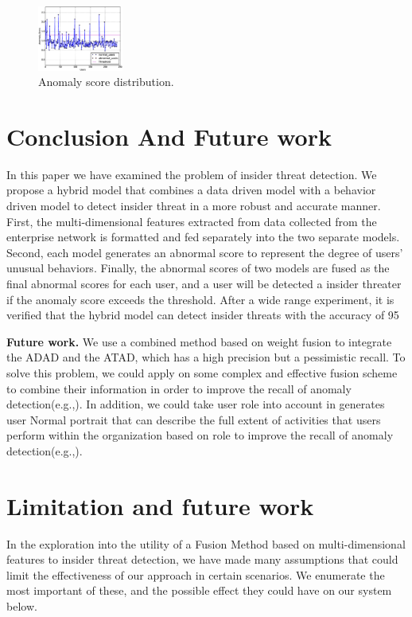 \documentclass[conference]{IEEEtran}
\begin{document}
\begin{figure}[htb]
\centerline{\includegraphics[width = 0.25\textwidth]{figure/figure8.eps}}
\caption{Anomaly score distribution.}
\label{fig}
\end{figure}

\section{Conclusion And Future work}

In this paper we have examined the problem of insider threat detection. We propose a hybrid model that combines a data driven model with a behavior driven model to detect insider threat in a more robust and accurate manner. 
First, the multi-dimensional features extracted from data collected  from the enterprise network is formatted and fed separately into the two separate models. Second, each model generates an abnormal score to represent the degree of users' unusual behaviors. Finally, the abnormal scores of two models are fused as the final abnormal scores for each user, and a user will be detected a insider threater if the anomaly score exceeds the threshold. After a wide range experiment, it is 
verified that the hybrid model can detect insider threats with the accuracy of 95%



\textbf{Future work.}
We use a combined method based on weight fusion to integrate the ADAD and the ATAD, which has a high precision but a pessimistic recall. To solve this problem, we could apply on some complex and effective fusion scheme to combine their information in order to improve the recall of anomaly detection(e.g.,\cite{b49}).  In addition, we could take user role into account in generates user Normal portrait that can describe the full extent of activities that users perform within the organization based on role to improve the recall of anomaly detection(e.g.,\cite{b50}).   	

\iffalse
\section{Limitation and future work}

In the exploration into the utility of a Fusion Method based on multi-dimensional features to insider threat detection, we have made many assumptions that could limit the effectiveness of our approach in certain scenarios. We enumerate the most important of these, and the possible effect they could have on our system below.
\end{document}
